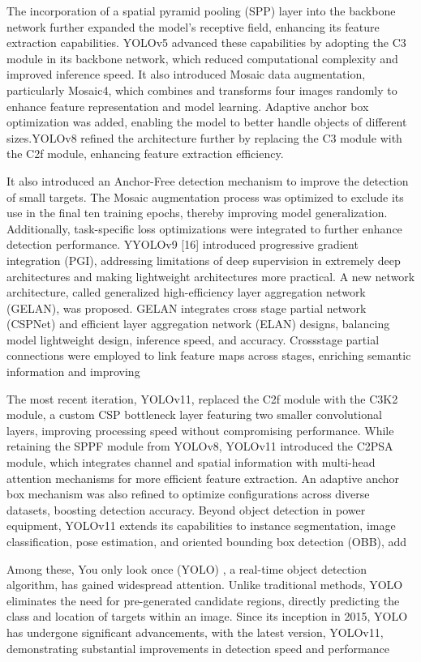 \documentclass[a4paper,10pt,twocolumn]{article}
\numberwithin{figure}{section}
\numberwithin{table}{section}
\begin{document}
The incorporation of a spatial
pyramid pooling (SPP) layer into the backbone network further
expanded the model’s receptive field, enhancing its feature
extraction capabilities. YOLOv5 advanced these capabilities
by adopting the C3 module in its backbone network, which
reduced computational complexity and improved inference
speed. It also introduced Mosaic data augmentation, particularly Mosaic4, which combines and transforms four images
randomly to enhance feature representation and model learning. Adaptive anchor box optimization was added, enabling
the model to better handle objects of different sizes.YOLOv8
refined the architecture further by replacing the C3 module
with the C2f module, enhancing feature extraction efficiency.

It also introduced an Anchor-Free detection mechanism to
improve the detection of small targets. The Mosaic augmentation process was optimized to exclude its use in the final
ten training epochs, thereby improving model generalization.
Additionally, task-specific loss optimizations were integrated
to further enhance detection performance. YYOLOv9 [16] introduced progressive gradient integration (PGI), addressing
limitations of deep supervision in extremely deep architectures and making lightweight architectures more practical. A
new network architecture, called generalized high-efficiency
layer aggregation network (GELAN), was proposed. GELAN
integrates cross stage partial network (CSPNet) and efficient
layer aggregation network (ELAN) designs, balancing model
lightweight design, inference speed, and accuracy. Crossstage partial connections were employed to link feature maps
across stages, enriching semantic information and improving


The most recent iteration, YOLOv11, replaced the
C2f module with the C3K2 module, a custom CSP bottleneck
layer featuring two smaller convolutional layers, improving
processing speed without compromising performance. While
retaining the SPPF module from YOLOv8, YOLOv11 introduced the C2PSA module, which integrates channel and spatial
information with multi-head attention mechanisms for more
efficient feature extraction. An adaptive anchor box mechanism was also refined to optimize configurations across diverse
datasets, boosting detection accuracy. Beyond object detection
in power equipment, YOLOv11 extends its capabilities to
instance segmentation, image classification, pose estimation,
and oriented bounding box detection (OBB), add



Among these, You only
look once (YOLO) , a real-time object detection algorithm,
has gained widespread attention. Unlike traditional methods,
YOLO eliminates the need for pre-generated candidate regions, directly predicting the class and location of targets
within an image. Since its inception in 2015, YOLO has
undergone significant advancements, with the latest version,
YOLOv11, demonstrating substantial improvements in 
detection speed and performance
\end{document}
